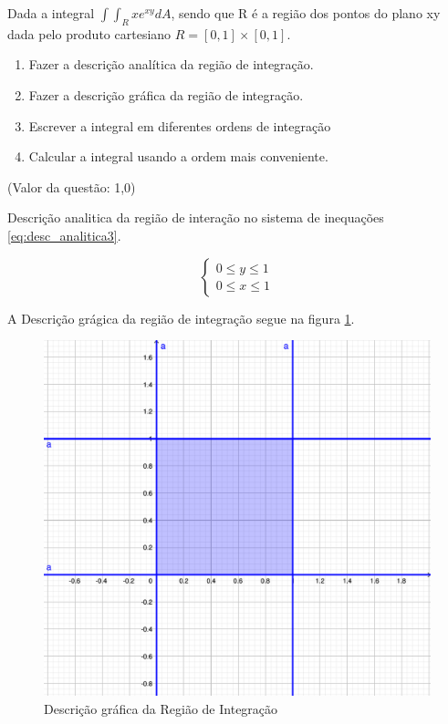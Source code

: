 \documentclass[10pt,a4paper]{article}
\begin{document}
	Dada a integral $ \int \int_R x e^{xy} dA $, sendo que R é a região dos pontos do plano xy dada pelo produto cartesiano $ R=[0, 1] \times [0, 1] $.
	
	\begin{enumerate}[a]
		\item Fazer a descrição analítica da região de integração.
		\item Fazer a descrição gráfica da região de integração.
		\item Escrever a integral em diferentes ordens de integração
		\item Calcular a integral usando a ordem mais conveniente.
	\end{enumerate}

	(Valor da questão: 1,0)

	Descrição analitica da região de interação no sistema de inequações \ref{eq:desc_analitica3}.
	
	\begin{equation} \label{eq:desc_analitica3}
		\left\{
			\begin{array}{l}
				0 \le y \le 1 \\
				0 \le x \le 1
			\end{array}
		\right.
	\end{equation}
	
	A Descrição grágica da região de integração segue na figura \ref{fig:integrais-multiplas-3a}.
	
	\begin{figure}[h]
		\centering
		\includegraphics[width=0.7\linewidth]{fig/integrais-multiplas-3a}
		\caption{Descrição gráfica da Região de Integração}
		\label{fig:integrais-multiplas-3a}
	\end{figure}
\end{document}
